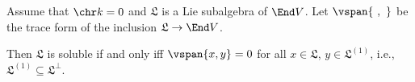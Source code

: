 Assume that $\chr k = 0$ and $\mathfrak{L}$ is a Lie subalgebra of
$\End V$. Let $\vspan{\ ,\ }$ be the trace form of the inclusion
$\mathfrak{L}\to \End V$.

Then $\mathfrak{L}$ is soluble if and only iff
$\vspan{x, y} = 0$ for all $x \in \mathfrak{L}$, $y \in \mathfrak{L}^{(1)}$,
i.e., $\mathfrak{L}^{(1)} \subseteq \mathfrak{L}^{\perp}$.
